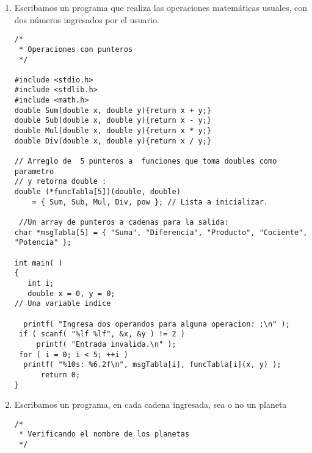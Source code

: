 \documentclass[twoside,10.5pt]{article}%
\begin{document}
\begin{enumerate}
\begin{verbatim}
#include <stdio.h>

#define N 10


void max_min(int a[], int n, int *max, int *min);

int main(void)
{ 
  
  int b[N], i,  mayor, menor;
   printf("Ingresa los  %d numeros:", N);
     for (i = 0; i < N; i ++)
     scanf("%d", &b[i]);
     max_min(b, N, &mayor, &menor);
    printf("Mayor: %d\n", mayor);
    printf("Menor: %d\n",  menor);
     return 0;
}

void max_min(int a[],  int n, int *max,int *min)
  {
     int i;
     *max = *min = a[0];
     for (i = 1; i < n; i ++){
       if (a[i] > *max) 
	 *max = a[i];
       else if (a[i] < *min)
	 *min = a[i];
     }
  }
\end{verbatim}

\item Escribamos un programa que realiza las operaciones matem\'aticas usuales, con dos n\'umeros ingresados por el usuario. 



\begin{verbatim}
/*
 * Operaciones con punteros
 */

#include <stdio.h>
#include <stdlib.h>
#include <math.h>
double Sum(double x, double y){return x + y;}
double Sub(double x, double y){return x - y;}
double Mul(double x, double y){return x * y;}
double Div(double x, double y){return x / y;}

// Arreglo de  5 punteros a  funciones que toma doubles como parametro 
// y retorna double :
double (*funcTabla[5])(double, double)
    = { Sum, Sub, Mul, Div, pow }; // Lista a inicializar.

 //Un array de punteros a cadenas para la salida: 
char *msgTabla[5] = { "Suma", "Diferencia", "Producto", "Cociente", "Potencia" };

int main( )
{
   int i;
   double x = 0, y = 0;
// Una variable indice
   
  printf( "Ingresa dos operandos para alguna operacion: :\n" );
 if ( scanf( "%lf %lf", &x, &y ) != 2 )
     printf( "Entrada invalida.\n" );
 for ( i = 0; i < 5; ++i )
  printf( "%10s: %6.2f\n", msgTabla[i], funcTabla[i](x, y) );
      return 0;
}
\end{verbatim}

\item Escribamos un programa, en cada cadena ingresada, sea o no un planeta

\begin{verbatim}
/*
 * Verificando el nombre de los planetas
 */


\end{verbatim}
\end{enumerate}
\end{document}
